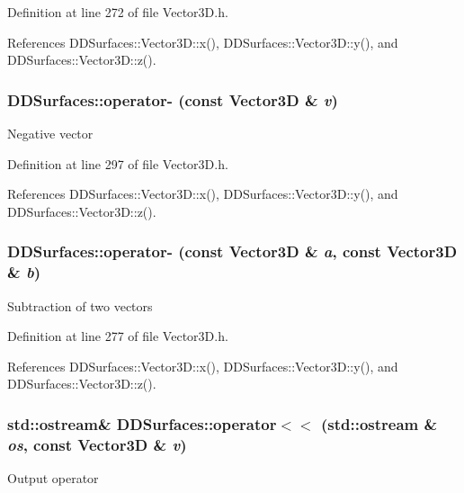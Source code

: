Definition at line 272 of file Vector3D.h.

References DDSurfaces::Vector3D::x(), DDSurfaces::Vector3D::y(), and DDSurfaces::Vector3D::z().\hypertarget{namespace_d_d_surfaces_a34c1378c2915634e7266335c283ad07d}{
\subsubsection[{operator-\/}]{ DDSurfaces::operator-\/ (const Vector3D \& {\em v})}}
\label{namespace_d_d_surfaces_a34c1378c2915634e7266335c283ad07d}
Negative vector 

Definition at line 297 of file Vector3D.h.

References DDSurfaces::Vector3D::x(), DDSurfaces::Vector3D::y(), and DDSurfaces::Vector3D::z().\hypertarget{namespace_d_d_surfaces_a99285e6f4b3e9bbe41a5ce357ed5f4ce}{
\subsubsection[{operator-\/}]{ DDSurfaces::operator-\/ (const Vector3D \& {\em a}, \/  const Vector3D \& {\em b})}}
\label{namespace_d_d_surfaces_a99285e6f4b3e9bbe41a5ce357ed5f4ce}
Subtraction of two vectors 

Definition at line 277 of file Vector3D.h.

References DDSurfaces::Vector3D::x(), DDSurfaces::Vector3D::y(), and DDSurfaces::Vector3D::z().\hypertarget{namespace_d_d_surfaces_a7253b384ad158db02712cc561182ce19}{
\subsubsection[{operator$<$$<$}]{\setlength{\rightskip}{0pt plus 5cm}std::ostream\& DDSurfaces::operator$<$$<$ (std::ostream \& {\em os}, \/  const Vector3D \& {\em v})}}
\label{namespace_d_d_surfaces_a7253b384ad158db02712cc561182ce19}
Output operator 

